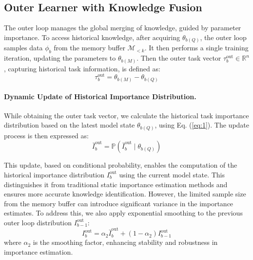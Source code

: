 


\subsection{Outer Learner with Knowledge Fusion}
The outer loop manages the global merging of knowledge, guided by parameter importance.
To access historical knowledge, after acquiring $\theta_{b(Q)}$, the outer loop samples data $\phi_{b}$ from the memory buffer $\mathcal{M}_{<k}$. It then performs a single training iteration, updating the parameters to $\theta_{b(M)}$. Then the outer task vector $\tau_b^{\text{out}} \in \mathbb{R}^n$, capturing historical task information, is defined as:
\begin{equation}
\tau_b^{\text{out}} = \theta_{b(M)} - \theta_{b(Q)}
\end{equation}

\paragraph{Dynamic Update of Historical Importance Distribution.}
While obtaining the outer task vector, we calculate the historical task importance distribution based on the latest model state $\theta_{b(Q)}$, using Eq. (\ref{eq:1}).
The update process is then expressed as:
\begin{equation}
\bar{I}_b^{\text{out}} = \mathbb{P}(\bar{I}_b^{\text{out}} \mid \theta_{b(Q)})
\end{equation} 

This update, based on conditional probability, enables the computation of the historical importance distribution $I_b^{\text{out}}$ using the current model state.
This distinguishes it from traditional static importance estimation methods and ensures more accurate knowledge identification. 
However, the limited sample size from the memory buffer can introduce significant variance in the importance estimates.
To address this, we also apply exponential smoothing to the previous outer loop distribution $I_{b-1}^{\text{out}}$:
\begin{equation}
I_b^{\text{out}} = \alpha_2 \bar{I}_b^{\text{out}} + (1 - \alpha_2) I_{b-1}^{\text{out}} \label{eq:out}
\end{equation} 
where $\alpha_2$ is the smoothing factor, enhancing stability and robustness in importance estimation.

